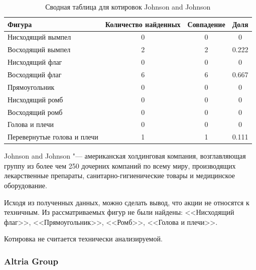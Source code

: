 \documentclass[bachelor, och, coursework]{SCWorks}
\begin{document}
    \begin{table}[!hbt]
        \caption{Сводная таблица для котировок Johnson and Johnson} 
        \centering
        \begin{tabular}{|l|c|c|c|}
        \hline
        Фигура                      & \multicolumn{1}{l|}{Количество найденных} & Совпадение & Доля  \\ \hline
        Нисходящий вымпел           & 0                                         & 0          & 0     \\ \hline
        Восходящий вымпел           & 2                                         & 2          & 0.222 \\ \hline
        Нисходящий флаг             & 0                                         & 0          & 0     \\ \hline
        Восходящий флаг             & 6                                         & 6          & 0.667 \\ \hline
        Прямоугольник               & 0                                         & 0          & 0     \\ \hline
        Нисходящий ромб             & 0                                         & 0          & 0     \\ \hline
        Восходящий ромб             & 0                                         & 0          & 0     \\ \hline
        Голова и плечи              & 0                                         & 0          & 0     \\ \hline
        Перевернутые голова и плечи & 1                                         & 1          & 0.111 \\ \hline
        \end{tabular} 
    \end{table}

    
        Johnson and Johnson "--- американская холдинговая компания,
        возглавляющая группу из более чем 250 дочерних компаний по всему миру,
        производящих лекарственные препараты, санитарно-гигиенические товары и
        медицинское оборудование.
    
        Исходя из полученных данных, можно сделать вывод, что акции не относятся
        к техничным. Из рассматриваемых фигур не были найдены: <<Нисходящий 
        флаг>>, <<Прямоугольник>>, <<Ромб>>, <<Голова и плечи>>.

        Котировка не считается технически анализируемой.

        \subsubsection{Altria Group}
    
\end{document}
